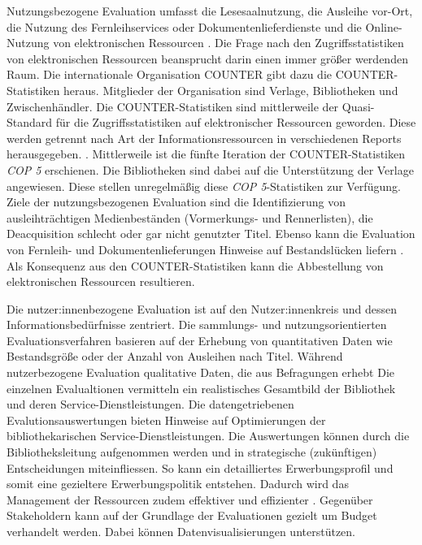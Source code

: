 Nutzungsbezogene Evaluation umfasst die Lesesaalnutzung, die Ausleihe vor-Ort, die Nutzung des Fernleihservices oder Dokumentenlieferdienste und die Online-Nutzung von elektronischen Ressourcen \cite[vgl.][254 ff.]{johannsen_jochen_bestands-_2015}.
Die Frage nach den Zugriffsstatistiken von elektronischen Ressourcen beansprucht darin einen immer größer werdenden Raum.
Die internationale Organisation \acrfull{COUNTER} gibt dazu die COUNTER-Statistiken heraus. Mitglieder der Organisation sind Verlage, Bibliotheken
und Zwischenhändler. Die COUNTER-Statistiken sind mittlerweile der Quasi-Standard für die Zugriffsstatistiken 
auf elektronischer Ressourcen geworden. Diese werden getrennt nach Art der Informationsressourcen in verschiedenen Reports herausgegeben. \cite[vgl.][260 ff.]{johannsen_jochen_bestands-_2015}. 
Mittlerweile ist die fünfte Iteration der COUNTER-Statistiken \textit{\acrshort{COP 5}} erschienen. 
Die Bibliotheken sind dabei auf die Unterstützung der Verlage angewiesen. Diese stellen unregelmäßig diese \textit{\acrshort{COP 5}}-Statistiken zur
Verfügung. Ziele der nutzungsbezogenen Evaluation sind die Identifizierung von ausleihträchtigen Medienbeständen (Vormerkungs- und Rennerlisten), 
die Deacquisition schlecht oder gar nicht genutzter Titel. Ebenso kann die Evaluation von Fernleih- und Dokumentenlieferungen Hinweise auf Bestandslücken liefern
\cite[vgl.][255 ff.]{johannsen_jochen_bestands-_2015}. Als Konsequenz aus den COUNTER-Statistiken kann die Abbestellung von elektronischen Ressourcen resultieren.

Die nutzer:innenbezogene Evaluation ist auf den Nutzer:innenkreis und dessen Informationsbedürfnisse zentriert. 
Die sammlungs- und nutzungsorientierten Evaluationsverfahren basieren auf der Erhebung von quantitativen Daten wie Bestandsgröße oder der Anzahl von Ausleihen nach Titel. 
Während nutzerbezogene Evaluation qualitative Daten, die aus Befragungen erhebt
Die einzelnen Evalualtionen vermitteln ein realistisches Gesamtbild der Bibliothek und deren Service-Dienstleistungen. 
Die datengetriebenen Evalutionsauswertungen bieten Hinweise auf Optimierungen der bibliothekarischen Service-Dienstleistungen. 
Die Auswertungen können durch die Bibliotheksleitung aufgenommen werden und in strategische (zukünftigen) Entscheidungen miteinfliessen. 
So kann ein detailliertes Erwerbungsprofil und somit eine gezieltere Erwerbungspolitik entstehen. 
Dadurch wird das Management der Ressourcen zudem effektiver und effizienter \cite[vgl.][297]{johnson_peggy_fundamentals_2014}.
Gegenüber Stakeholdern kann auf der Grundlage der Evaluationen gezielt um Budget verhandelt werden. 
Dabei können Datenvisualisierungen unterstützen.


